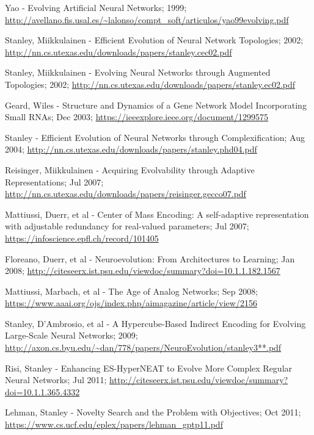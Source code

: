 \documentclass[journal, a4paper]{IEEEtran}
\begin{document}
\begin{thebibliography}{5}

    Yao - Evolving Artificial Neural Networks; 1999;
    \url{http://avellano.fis.usal.es/~lalonso/compt_soft/articulos/yao99evolving.pdf}

    Stanley, Miikkulainen - Efficient Evolution of Neural Network Topologies; 2002;
    \url{http://nn.cs.utexas.edu/downloads/papers/stanley.cec02.pdf}

    Stanley, Miikkulainen - Evolving Neural Networks through Augmented Topologies; 2002;
    \url{http://nn.cs.utexas.edu/downloads/papers/stanley.ec02.pdf}

    Geard, Wiles - Structure and Dynamics of a Gene Network Model Incorporating Small RNAs; Dec 2003;
    \url{https://ieeexplore.ieee.org/document/1299575}

    Stanley - Efficient Evolution of Neural Networks through Complexification; Aug 2004;
    \url{http://nn.cs.utexas.edu/downloads/papers/stanley.phd04.pdf}

    Reisinger, Miikkulainen - Acquiring Evolvability through Adaptive Representations; Jul 2007;
    \url{http://nn.cs.utexas.edu/downloads/papers/reisinger.gecco07.pdf}

    Mattiussi, Duerr, et al - Center of Mass Encoding: A self-adaptive representation with adjustable redundancy for real-valued parameters; Jul 2007;
    \url{https://infoscience.epfl.ch/record/101405}

    Floreano, Duerr, et al - Neuroevolution: From Architectures to Learning; Jan 2008;
    \url{http://citeseerx.ist.psu.edu/viewdoc/summary?doi=10.1.1.182.1567}

    Mattiussi, Marbach, et al - The Age of Analog Networks; Sep 2008;
    \url{https://www.aaai.org/ojs/index.php/aimagazine/article/view/2156}

    Stanley, D’Ambrosio, et al - A Hypercube-Based Indirect Encoding for Evolving Large-Scale Neural Networks; 2009;
    \url{http://axon.cs.byu.edu/~dan/778/papers/NeuroEvolution/stanley3**.pdf}

    Risi, Stanley - Enhancing ES-HyperNEAT to Evolve More Complex Regular Neural Networks; Jul 2011;
    \url{http://citeseerx.ist.psu.edu/viewdoc/summary?doi=10.1.1.365.4332}

    Lehman, Stanley - Novelty Search and the Problem with Objectives; Oct 2011;
    \url{https://www.cs.ucf.edu/eplex/papers/lehman_gptp11.pdf}


\end{thebibliography}
\end{document}
